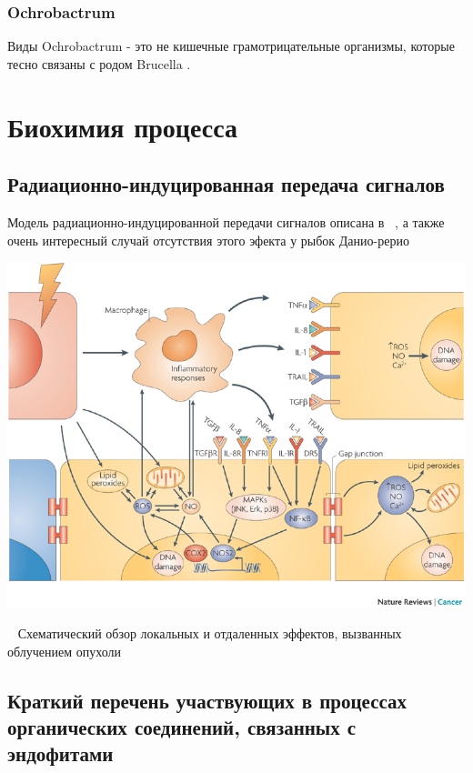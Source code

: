 \documentclass[11pt]{article}
\begin{document}
	\subsubsection{Ochrobactrum}
	 Виды Ochrobactrum - это не кишечные грамотрицательные организмы, которые тесно связаны с родом Brucella . ~\cite{Ochrobactrum_1}
	 	 	
	\section{Биохимия процесса}
	
	\subsection{Радиационно-индуцированная передача сигналов }
	Модель радиационно-индуцированной передачи сигналов описана в ~\cite{nrc2603, j.envres.2019.04.033}, а также очень интересный случай отсутствия этого эфекта у рыбок Данио-рерио ~\cite{09553002.2011.584939}
	
	\includegraphics[width=\textwidth]{Key-pathways-affecting-bystander-signals-Cells-respond-to-direct-radiation-red-cell-by}
	
	~\cite{s41416-020-0942-3} Схематический обзор локальных и отдаленных эффектов, вызванных облучением опухоли
	
	
	\subsection{Краткий перечень участвующих в процессах органических соединений, связанных с эндофитами}
	
\end{document}
